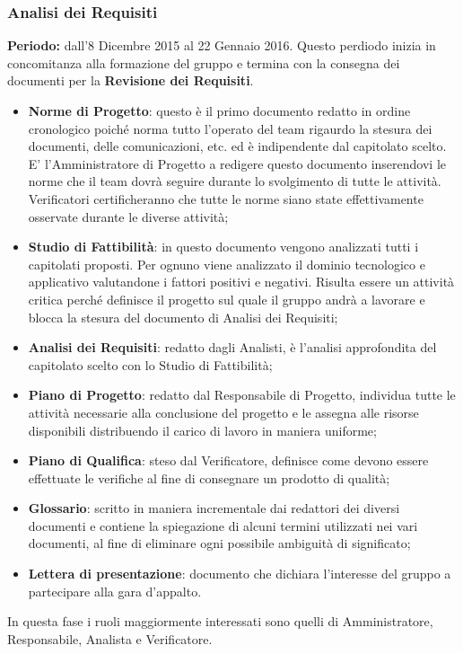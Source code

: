 \subsubsection{Analisi dei Requisiti}
\textbf{Periodo:} dall'8 Dicembre 2015 al 22 Gennaio 2016.
Questo perdiodo inizia in concomitanza alla formazione del gruppo e termina con la consegna dei documenti per la \textbf{Revisione dei Requisiti}.
\begin{itemize}
		\item \textbf{Norme di Progetto}: questo è il primo documento redatto in ordine cronologico poiché norma tutto l'operato del team rigaurdo la stesura dei documenti, delle comunicazioni, etc. ed è indipendente dal capitolato scelto. E' l’Amministratore di Progetto a redigere questo documento inserendovi le norme che il team dovrà seguire durante lo svolgimento di tutte le attività. Verificatori certificheranno che tutte le norme siano state effettivamente osservate durante le diverse attività;
		\item \textbf{Studio di Fattibilità}: in questo documento vengono analizzati tutti i capitolati proposti. Per ognuno viene analizzato il dominio tecnologico e applicativo valutandone i fattori positivi e negativi. Risulta essere un attività	critica perché definisce il progetto sul quale il gruppo andrà a lavorare e blocca la stesura del documento di Analisi dei Requisiti;
		\item \textbf{Analisi dei Requisiti}: redatto dagli Analisti, è l'analisi approfondita del capitolato scelto con lo Studio di Fattibilità;
		\item \textbf{Piano di Progetto}: redatto dal Responsabile di Progetto, individua tutte le attività necessarie alla conclusione del progetto e le assegna alle risorse disponibili distribuendo il carico di lavoro in maniera uniforme;
		\item \textbf{Piano di Qualifica}: steso dal Verificatore, definisce come devono essere effettuate le verifiche al fine di consegnare un prodotto di qualità;
		\item \textbf{Glossario}: scritto in maniera incrementale dai redattori dei diversi documenti e contiene la spiegazione di alcuni termini utilizzati nei vari documenti, al fine di eliminare ogni possibile	ambiguità di significato;
		\item \textbf{Lettera di presentazione}: documento che dichiara l’interesse del gruppo a partecipare alla gara d’appalto.
\end{itemize}
In questa fase i ruoli maggiormente interessati sono quelli di Amministratore, Responsabile, Analista e Verificatore. 

